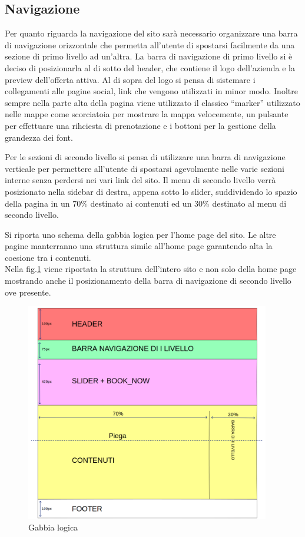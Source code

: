 \documentclass[a4paper,12pt,hidelinks]{report}
\begin{document}
  \subsection{Navigazione}
    Per quanto riguarda la navigazione del sito sarà necessario organizzare una barra di navigazione orizzontale che permetta all'utente di spostarsi facilmente da una sezione di primo livello
    ad un'altra. La barra di navigazione di primo livello si è deciso di posizionarla al di sotto del header, che contiene il logo dell'azienda e la preview dell'offerta attiva. 
    Al di sopra del logo si pensa di sistemare i collegamenti alle pagine social, link che vengono utilizzati in minor modo.
    Inoltre sempre nella parte alta della pagina viene utilizzato il classico ``marker'' utilizzato nelle mappe come scorciatoia per mostrare la mappa velocemente, 
    un pulsante per effettuare una rihciesta di prenotazione e i bottoni per la gestione della grandezza dei font.
    \par Per le sezioni di secondo livello si pensa di utilizzare una barra di navigazione verticale per permettere all'utente di spostarsi agevolmente nelle varie sezioni interne senza
    perdersi nei vari link del sito. Il menu di secondo livello verrà posizionato nella sidebar di destra, appena sotto lo slider, suddividendo lo spazio della pagina in un 70\% destinato 
    ai contenuti ed un 30\% destinato al menu di secondo livello.
    \par Si riporta uno schema della gabbia logica per l'home page del sito. Le altre pagine manterranno una struttura simile all'home page garantendo alta la coesione tra i contenuti.
    \\Nella fig.\ref{fig:gabbiaLogica} viene riportata la struttura dell'intero sito e non solo della home page mostrando anche 
    il posizionamento della barra di navigazione di secondo livello ove presente.
    \begin{figure}[h!]%
      \includegraphics[width=0.95\textwidth,keepaspectratio=true]{img/gabbiaLogica}
      \centering
      \caption{Gabbia logica}%
      \label{fig:gabbiaLogica}%
    \end{figure}
  \newpage
  
\end{document}
